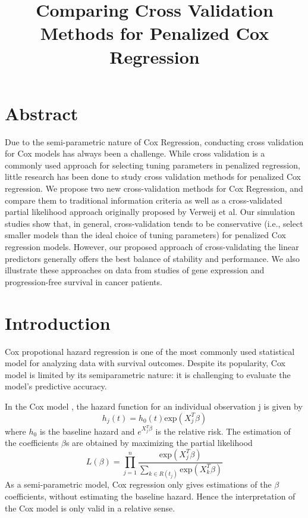 \documentclass{article}\usepackage[]{graphicx}\usepackage[]{color}
\title{Comparing Cross Validation Methods for Penalized Cox Regression}
\author{
}
\date{ }
\begin{document}
\maketitle

\section*{Abstract}
Due to the semi-parametric nature of Cox Regression, conducting cross validation for Cox models has always been a challenge. While cross validation is a commonly used approach for selecting tuning parameters in penalized regression, little research has been done to study cross validation methods for penalized Cox regression. We propose two new cross-validation methods for Cox Regression, and compare them to traditional information criteria as well as a cross-validated partial likelihood approach originally proposed by Verweij et al. Our simulation studies show that, in general, cross-validation tends to be conservative (i.e., select smaller models than the ideal choice of tuning parameters) for penalized Cox regression models. However, our proposed approach of cross-validating the linear predictors generally offers the best balance of stability and performance. We also illustrate these approaches on data from studies of gene expression and progression-free survival in cancer patients.

\section{Introduction}
Cox propotional hazard regression is one of the most commonly used statistical model for analyzing data with survival outcomes. Despite its popularity, Cox model is limited by its semiparametric nature: it is challenging to evaluate the model's predictive accuracy.

In the Cox model \citep{Cox1975}, the hazard function for an individual observation j is given by \begin{equation}h_{j}(t) = h_{0}(t) \text{exp}( X_{j}^{T} \beta)\end{equation} where $h_{0}$ is the baseline hazard and $e^{X_{j}^{T} \beta}$ is the relative risk. The estimation of the coefficients $\beta$s are obtained by maximizing the partial likelihood \begin{equation}L(\beta) = \prod_{j=1}^{n} \frac{\text{exp} ( X_{j}^{T} \beta)}{\sum_{ k \in R(t_{j})}\text{exp} ( X_{k}^{T} \beta)}\end{equation} As a semi-parametric model, Cox regression only gives estimations of the $\beta$ coefficients, without estimating the baseline hazard. Hence the interpretation of the Cox model is only valid in a relative sense.
\end{document}
